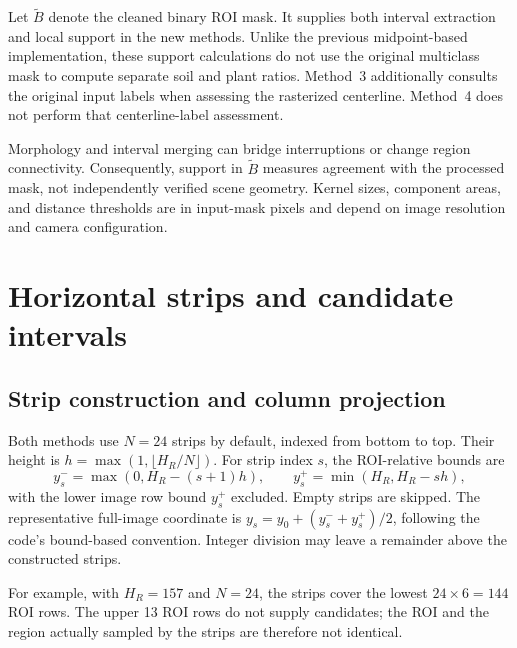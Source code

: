 Let $\widetilde B$ denote the cleaned binary ROI mask. It supplies both
interval extraction and local support in the new methods. Unlike the
previous midpoint-based implementation, these support calculations do
not use the original multiclass mask to compute separate soil and plant
ratios. Method~3 additionally consults the original input labels when
assessing the rasterized centerline. Method~4 does not perform that
centerline-label assessment.

Morphology and interval merging can bridge interruptions or change region
connectivity. Consequently, support in $\widetilde B$ measures agreement
with the processed mask, not independently verified scene geometry.
Kernel sizes, component areas, and distance thresholds are in input-mask
pixels and depend on image resolution and camera configuration.

\section{Horizontal strips and candidate intervals}
\label{sec:c4_candidates}

\subsection{Strip construction and column projection}
\label{subsec:c4_strips}

Both methods use $N=24$ strips by default, indexed from bottom to top.
Their height is $h=\max(1,\lfloor H_R/N\rfloor)$. For strip index $s$,
the ROI-relative bounds are
\begin{equation}
    y_s^- = \max(0,H_R-(s+1)h),\qquad
    y_s^+ = \min(H_R,H_R-sh),
\end{equation}
with the lower image row bound $y_s^+$ excluded. Empty strips are skipped.
The representative full-image coordinate is
$y_s=y_0+(y_s^-+y_s^+)/2$, following the code's bound-based convention.
Integer division may leave a remainder above the constructed strips.

For example, with $H_R=157$ and $N=24$, the strips cover the lowest
$24\times6=144$ ROI rows. The upper 13 ROI rows do not supply candidates;
the ROI and the region actually sampled by the strips are therefore not
identical.

